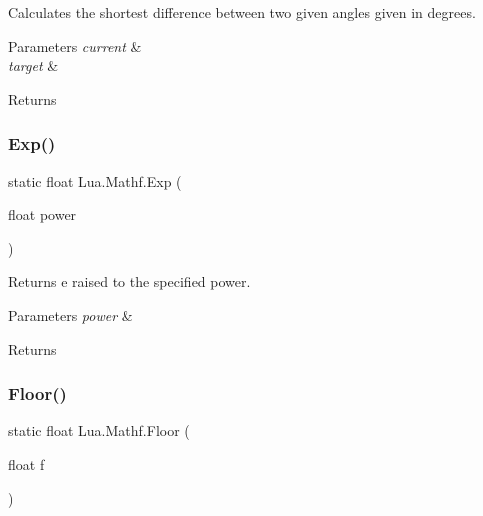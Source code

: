 Calculates the shortest difference between two given angles given in degrees. 


\begin{DoxyParams}{Parameters}
{\em current} & \\
\hline
{\em target} & \\
\hline
\end{DoxyParams}
\begin{DoxyReturn}{Returns}

\end{DoxyReturn}
\mbox{\label{class_lua_1_1_mathf_a2bde76bb17351b51bc55e2d65f8e9263}} 
\subsubsection{\texorpdfstring{Exp()}{Exp()}}
{\footnotesize\ttfamily static float Lua.\+Mathf.\+Exp (\begin{DoxyParamCaption}\item[{float}]{power }\end{DoxyParamCaption})\hspace{0.3cm}{\ttfamily [static]}}



Returns e raised to the specified power. 


\begin{DoxyParams}{Parameters}
{\em power} & \\
\hline
\end{DoxyParams}
\begin{DoxyReturn}{Returns}

\end{DoxyReturn}
\mbox{\label{class_lua_1_1_mathf_a72fc411403ab2b7e87ffd6e3989bc9e4}} 
\subsubsection{\texorpdfstring{Floor()}{Floor()}}
{\footnotesize\ttfamily static float Lua.\+Mathf.\+Floor (\begin{DoxyParamCaption}\item[{float}]{f }\end{DoxyParamCaption})\hspace{0.3cm}{\ttfamily [static]}}



